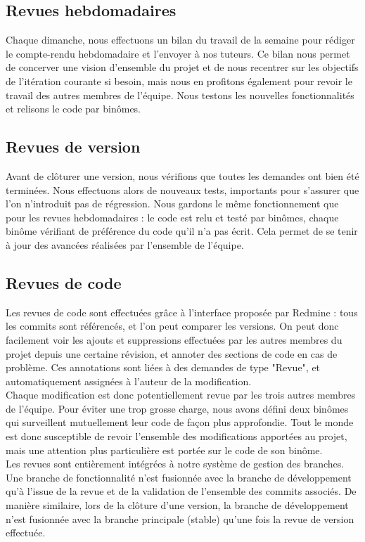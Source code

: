 \subsection{Revues hebdomadaires}

Chaque dimanche, nous effectuons un bilan du travail de la semaine pour rédiger le compte-rendu hebdomadaire et l'envoyer à nos tuteurs. Ce bilan nous permet de concerver une vision d'ensemble du projet et de nous recentrer sur les objectifs de l'itération courante si besoin, mais nous en profitons également pour revoir le travail des autres membres de l'équipe. Nous testons les nouvelles fonctionnalités et relisons le code par binômes.

\subsection{Revues de version}

Avant de clôturer une version, nous vérifions que toutes les demandes ont bien été terminées. Nous effectuons alors de nouveaux tests, importants pour s'assurer que l'on n'introduit pas de régression. Nous gardons le même fonctionnement que pour les revues hebdomadaires : le code est relu et testé par binômes, chaque binôme vérifiant de préférence du code qu'il n'a pas écrit. Cela permet de se tenir à jour des avancées réalisées par l'ensemble de l'équipe.

\subsection{Revues de code}

Les revues de code sont effectuées grâce à l'interface proposée par Redmine : tous les commits sont référencés, et l'on peut comparer les versions. On peut donc facilement voir les ajouts et suppressions effectuées par les autres membres du projet depuis une certaine révision, et annoter des sections de code en cas de problème. Ces annotations sont liées à des demandes de type "Revue", et automatiquement assignées à l'auteur de la modification.\\

Chaque modification est donc potentiellement revue par les trois autres membres de l'équipe. Pour éviter une trop grosse charge, nous avons défini deux binômes qui surveillent mutuellement leur code de façon plus approfondie. Tout le monde est donc susceptible de revoir l'ensemble des modifications apportées au projet, mais une attention plus particulière est portée sur le code de son binôme.\\

Les revues sont entièrement intégrées à notre système de gestion des branches. Une branche de fonctionnalité n'est fusionnée avec la branche de développement qu'à l'issue de la revue et de la validation de l'ensemble des commits associés. De manière similaire, lors de la clôture d'une version, la branche de développement n'est fusionnée avec la branche principale (stable) qu'une fois la revue de version effectuée.
